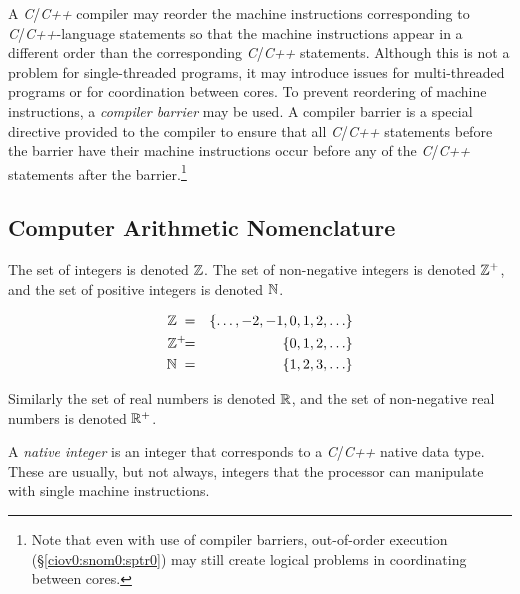 A \emph{C}/\emph{C++} compiler may reorder the machine 
instructions corresponding to \emph{C}/\emph{C++}-language 
statements so that the machine instructions appear in a 
different order than the corresponding \emph{C}/\emph{C++} 
statements.  Although this is not a problem for 
single-threaded programs, it may introduce issues for 
multi-threaded programs or for coordination between cores.  
To prevent reordering of machine instructions, a 
\emph{compiler barrier} may be used.  
A compiler barrier is a special directive provided to the 
compiler to ensure that all \emph{C}/\emph{C++} statements 
before the barrier have their machine instructions occur 
before any of the \emph{C}/\emph{C++} statements after the 
barrier.\footnote{Note that even with use of compiler 
barriers, out-of-order execution 
(\S{}\ref{ciov0:snom0:sptr0}) may still create logical 
problems in coordinating between cores.} 


\subsection{Computer Arithmetic Nomenclature}
\label{ciov0:snom0:scan0}

The set of integers is denoted 
${\mathbb{Z}}{}$\@.  The set of 
non-negative integers is denoted 
${\mathbb{Z}^+}{}$, and 
the set of positive integers is denoted 
${\mathbb{N}}{}$.  

\begin{eqnarray}
\label{eq:ciov0:snom0:scan0:01}
{\mathbb{Z}}{}   \;    & = & \{ \ldots , -2, -1, 0, 1, 2, \ldots \} \\
\label{eq:ciov0:snom0:scan0:02}
{\mathbb{Z}^+}{} \!\!\!\!\; & = & \{ 0, 1, 2, \ldots \}         \\
\label{eq:ciov0:snom0:scan0:03}
{\mathbb{N}}{}  \;  & = & \{ 1, 2, 3, \ldots \}
\end{eqnarray}

Similarly the set of real numbers is denoted 
${\mathbb{R}}$, and the set of 
non-negative real numbers is denoted 
${\mathbb{R}^+}$.  

A \emph{native integer} is an integer 
that corresponds to a \emph{C}/\emph{C++} native data type.  
These are usually, but not always, integers that the 
processor can manipulate with single machine instructions.  

